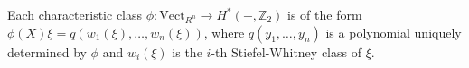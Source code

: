 Each characteristic class $\phi: \text{Vect}_{R^n} \rightarrow H^*(-, \mathbb{Z}_2)$ is of the form $\phi(X)\xi = q(w_1(\xi), \ldots, w_n(\xi))$, where $q(y_1, \ldots, y_n)$ is a polynomial uniquely determined by $\phi$ and $w_i(\xi)$ is the $i$-th Stiefel-Whitney class of $\xi$.
